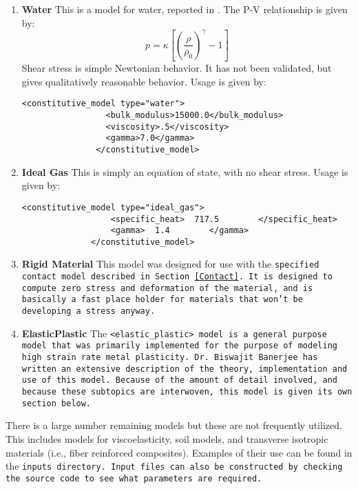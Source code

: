 \begin{enumerate}
\item{\bf Water}  This is a model for water, reported in \cite{water_model_ref}.
The P-V relationship is given by:
\begin{equation}
p=\kappa\left[\left(\frac{\rho}{\rho_0}\right)^{\gamma} - 1\right]
\end{equation}
Shear stress is simple Newtonian behavior.  It has not been validated,
but gives qualitatively reasonable behavior.  Usage is given by:
\begin{Verbatim}[fontsize=\footnotesize]
              <constitutive_model type="water">
                 <bulk_modulus>15000.0</bulk_modulus>
                 <viscosity>.5</viscosity>
                 <gamma>7.0</gamma>
               </constitutive_model>
\end{Verbatim}

\item{\bf Ideal Gas}  This is simply an equation of state, with no shear stress.
Usage is given by:

\begin{Verbatim}[fontsize=\footnotesize]
              <constitutive_model type="ideal_gas">
                  <specific_heat>  717.5        </specific_heat>
                  <gamma>  1.4        </gamma>
              </constitutive_model>
\end{Verbatim}

\item{\bf Rigid Material}  This model was designed for use with the
\tt specified \normalfont contact model described in Section~\ref{Contact}.
It is designed to compute zero stress and deformation of the material,
and is basically a fast place holder for materials that won't be developing
a stress anyway.

\item{\bf ElasticPlastic} The \tt <elastic\_plastic> \normalfont model is a
general purpose model that was primarily implemented for the purpose of
modeling high strain rate metal plasticity.  Dr. Biswajit Banerjee has
written an extensive description of the theory, implementation and use of
this model.  Because of the amount of detail involved, and because these
subtopics are interwoven, this model is given its own section below.

\end{enumerate}

There is a large number remaining models but these are not frequently utilized. 
This includes models for viscoelasticity, soil models, and transverse isotropic materials (i.e., fiber reinforced composites).
Examples of their use can be found in the \tt inputs \normalfont directory.
Input files can also be constructed by checking the source code to see
what parameters are required.

